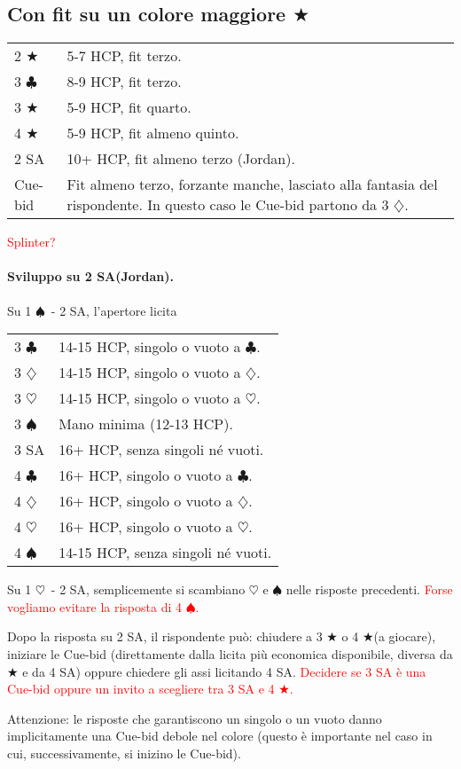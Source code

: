 \documentclass[a4paper,10pt]{article}
\renewcommand{\c}{$\clubsuit$\xspace}
\renewcommand{\d}{$\diamondsuit$\xspace}
\newcommand{\h}{$\heartsuit$\xspace}
\newcommand{\s}{$\spadesuit$\xspace}
\renewcommand{\j}{$\bigstar$\xspace}
\newcommand{\sa}{SA\xspace}
\newcommand{\smallspace}{\vskip0.3cm}
\newcommand{\note}[1]{\textcolor{red}{#1}}
\newenvironment{twocol}
  {\smallspace\noindent\begin{tabular}{l p{0.78\textwidth}}}
  {\end{tabular}\smallspace}
\begin{document}
\subsection{Con fit su un colore maggiore \j}
\begin{twocol}
 2 \j  & 5-7 HCP, fit terzo.\\
 3 \c & 8-9 HCP, fit terzo.\\
 3 \j  & 5-9 HCP, fit quarto.\\
 4 \j  & 5-9 HCP, fit almeno quinto.\\
 2 \sa & 10+ HCP, fit almeno terzo (Jordan).\\
 Cue-bid & Fit almeno terzo, forzante manche, lasciato alla fantasia del rispondente. In questo caso le Cue-bid partono da 3 \d.
\end{twocol}
\note{Splinter?}

\paragraph{Sviluppo su 2 \sa (Jordan).} Su 1 \s\ - 2 \sa, l'apertore licita
\begin{twocol}
 3 \c & 14-15 HCP, singolo o vuoto a \c.\\
 3 \d & 14-15 HCP, singolo o vuoto a \d.\\
 3 \h & 14-15 HCP, singolo o vuoto a \h.\\
 3 \s & Mano minima (12-13 HCP).\\
 3 \sa & 16+ HCP, senza singoli né vuoti.\\
 4 \c & 16+ HCP, singolo o vuoto a \c.\\
 4 \d & 16+ HCP, singolo o vuoto a \d.\\
 4 \h & 16+ HCP, singolo o vuoto a \h.\\
 4 \s & 14-15 HCP, senza singoli né vuoti.
\end{twocol}

\noindent Su 1 \h\ - 2 \sa, semplicemente si scambiano \h e \s nelle risposte precedenti. \note{Forse vogliamo evitare la risposta di 4 \s.}

Dopo la risposta su 2 \sa, il rispondente può: chiudere a 3 \j o 4 \j (a giocare), iniziare le Cue-bid (direttamente dalla licita più economica disponibile, diversa da \j e da 4 \sa) oppure chiedere gli assi licitando 4 \sa. \note{Decidere se 3 \sa è una Cue-bid oppure un invito a scegliere tra 3 \sa e 4 \j.}

Attenzione: le risposte che garantiscono un singolo o un vuoto danno implicitamente una Cue-bid debole nel colore (questo è importante nel caso in cui, successivamente, si inizino le Cue-bid).
\end{document}
